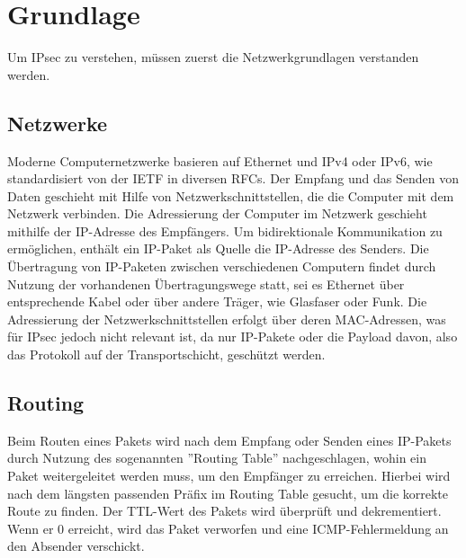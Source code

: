 


\section{Grundlage}
Um IPsec zu verstehen, müssen zuerst die Netzwerkgrundlagen verstanden werden.
\subsection{Netzwerke}
Moderne Computernetzwerke basieren auf Ethernet und \ac{IPv4} oder \ac{IPv6}, wie standardisiert
von der \ac{IETF} in diversen \acp{RFC}.
Der Empfang und das Senden von Daten geschieht mit Hilfe von Netzwerkschnittstellen, die die Computer
mit dem Netzwerk verbinden.
Die Adressierung der Computer im Netzwerk geschieht mithilfe der \ac{IP}-Adresse des Empfängers.
Um bidirektionale Kommunikation zu ermöglichen, enthält ein \ac{IP}-Paket als Quelle die
\ac{IP}-Adresse des Senders.
Die Übertragung von \ac{IP}-Paketen zwischen verschiedenen Computern findet durch Nutzung
der vorhandenen Übertragungswege statt, sei es Ethernet über entsprechende Kabel oder
über andere Träger, wie Glasfaser oder Funk.
Die Adressierung der Netzwerkschnittstellen erfolgt über deren MAC-Adressen, was für \ac{IPsec}
jedoch nicht relevant ist, da nur \ac{IP}-Pakete oder die Payload davon, also das Protokoll
auf der Transportschicht, geschützt werden.

\subsection{Routing}
Beim Routen eines Pakets wird nach dem Empfang oder Senden eines \ac{IP}-Pakets durch Nutzung
des sogenannten ''Routing Table'' nachgeschlagen, wohin ein Paket weitergeleitet
werden muss, um den Empfänger zu erreichen.
Hierbei wird nach dem längsten passenden Präfix im Routing Table gesucht, um die
korrekte Route zu finden.
Der \ac{TTL}-Wert des Pakets wird überprüft und dekrementiert. Wenn er 0 erreicht,
wird das Paket verworfen und eine \ac{ICMP}-Fehlermeldung an den Absender verschickt.


